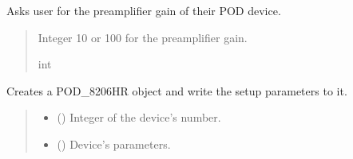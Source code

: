 \documentclass[letterpaper,10pt,english]{sphinxmanual}
\begin{document}
\begin{fulllineitems}
\begin{fulllineitems}
\label{\detokenize{Setup_8206HR:Setup_8206HR.Setup_8206HR._ChoosePreampGain}}
\pysigstartsignatures
{}
\pysigstopsignatures
\sphinxAtStartPar
Asks user for the preamplifier gain of their POD device.
\begin{quote}\begin{description}
\sphinxAtStartPar
Integer 10 or 100 for the preamplifier gain.

\sphinxAtStartPar
int

\end{description}\end{quote}

\end{fulllineitems}


\begin{fulllineitems}
\label{\detokenize{Setup_8206HR:Setup_8206HR.Setup_8206HR._ConnectPODdevice}}
\pysigstartsignatures
{}
\pysigstopsignatures
\sphinxAtStartPar
Creates a POD\_8206HR object and write the setup parameters to it.
\begin{quote}\begin{description}
\begin{itemize}
\item {} 
\sphinxAtStartPar
{} () \textendash{} Integer of the device’s number.

\item {} 
\sphinxAtStartPar
{} ({\hyperref[\detokenize{Setup_PodParameters:Setup_PodParameters.Params_8206HR}]{}}) \textendash{} Device’s parameters.


\end{itemize}
\end{description}
\end{quote}
\end{fulllineitems}
\end{fulllineitems}
\end{document}
